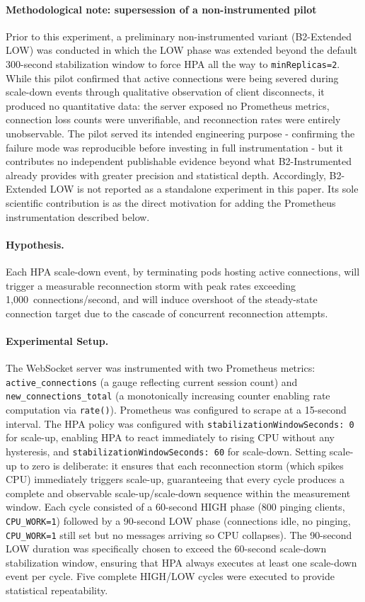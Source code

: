 \documentclass[twocolumn]{svjour3}
\begin{document}
\paragraph{Methodological note: supersession of a non-instrumented pilot}
Prior to this experiment, a preliminary non-instrumented variant (B2-Extended LOW) was conducted in which the LOW phase was extended beyond the default 300-second stabilization window to force HPA all the way to \texttt{minReplicas=2}. While this pilot confirmed that active connections were being severed during scale-down events through qualitative observation of client disconnects, it produced no quantitative data: the server exposed no Prometheus metrics, connection loss counts were unverifiable, and reconnection rates were entirely unobservable. The pilot served its intended engineering purpose - confirming the failure mode was reproducible before investing in full instrumentation - but it contributes no independent publishable evidence beyond what B2-Instrumented already provides with greater precision and statistical depth. Accordingly, B2-Extended LOW is not reported as a standalone experiment in this paper. Its sole scientific contribution is as the direct motivation for adding the Prometheus instrumentation described below.

\paragraph{Hypothesis.} Each HPA scale-down event, by terminating pods hosting active connections, will trigger a measurable reconnection storm with peak rates exceeding 1,000~connections/second, and will induce overshoot of the steady-state connection target due to the cascade of concurrent reconnection attempts.

\paragraph{Experimental Setup.} The WebSocket server was instrumented with two Prometheus metrics: \texttt{active\_connections} (a gauge reflecting current session count) and \texttt{new\_connections\_total} (a monotonically increasing counter enabling rate computation via \texttt{rate()}). Prometheus was configured to scrape at a 15-second interval. The HPA policy was configured with \texttt{stabilizationWindowSeconds: 0} for scale-up, enabling HPA to react immediately to rising CPU without any hysteresis, and \texttt{stabilizationWindowSeconds: 60} for scale-down. Setting scale-up to zero is deliberate: it ensures that each reconnection storm (which spikes CPU) immediately triggers scale-up, guaranteeing that every cycle produces a complete and observable scale-up/scale-down sequence within the measurement window. Each cycle consisted of a 60-second HIGH phase (800 pinging clients, \texttt{CPU\_WORK=1}) followed by a 90-second LOW phase (connections idle, no pinging, \texttt{CPU\_WORK=1} still set but no messages arriving so CPU collapses). The 90-second LOW duration was specifically chosen to exceed the 60-second scale-down stabilization window, ensuring that HPA always executes at least one scale-down event per cycle. Five complete HIGH/LOW cycles were executed to provide statistical repeatability.
\end{document}
